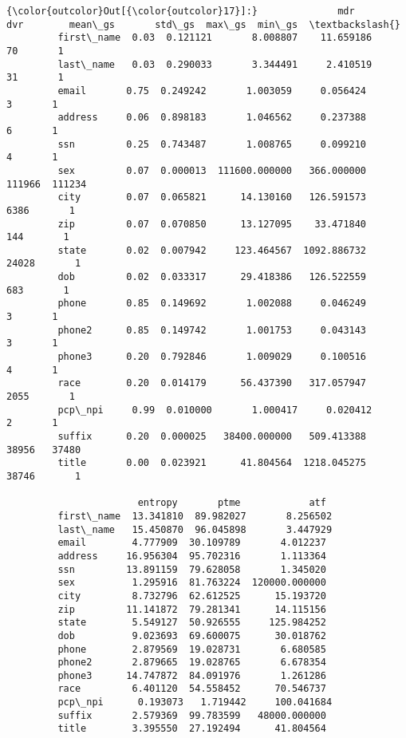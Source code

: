 \documentclass[11pt]{article}
\begin{document}
\begin{Verbatim}[commandchars=\\\{\}]
{\color{outcolor}Out[{\color{outcolor}17}]:}              mdr       dvr        mean\_gs       std\_gs  max\_gs  min\_gs  \textbackslash{}
         first\_name  0.03  0.121121       8.008807    11.659186      70       1   
         last\_name   0.03  0.290033       3.344491     2.410519      31       1   
         email       0.75  0.249242       1.003059     0.056424       3       1   
         address     0.06  0.898183       1.046562     0.237388       6       1   
         ssn         0.25  0.743487       1.008765     0.099210       4       1   
         sex         0.07  0.000013  111600.000000   366.000000  111966  111234   
         city        0.07  0.065821      14.130160   126.591573    6386       1   
         zip         0.07  0.070850      13.127095    33.471840     144       1   
         state       0.02  0.007942     123.464567  1092.886732   24028       1   
         dob         0.02  0.033317      29.418386   126.522559     683       1   
         phone       0.85  0.149692       1.002088     0.046249       3       1   
         phone2      0.85  0.149742       1.001753     0.043143       3       1   
         phone3      0.20  0.792846       1.009029     0.100516       4       1   
         race        0.20  0.014179      56.437390   317.057947    2055       1   
         pcp\_npi     0.99  0.010000       1.000417     0.020412       2       1   
         suffix      0.20  0.000025   38400.000000   509.413388   38956   37480   
         title       0.00  0.023921      41.804564  1218.045275   38746       1   
         
                       entropy       ptme            atf  
         first\_name  13.341810  89.982027       8.256502  
         last\_name   15.450870  96.045898       3.447929  
         email        4.777909  30.109789       4.012237  
         address     16.956304  95.702316       1.113364  
         ssn         13.891159  79.628058       1.345020  
         sex          1.295916  81.763224  120000.000000  
         city         8.732796  62.612525      15.193720  
         zip         11.141872  79.281341      14.115156  
         state        5.549127  50.926555     125.984252  
         dob          9.023693  69.600075      30.018762  
         phone        2.879569  19.028731       6.680585  
         phone2       2.879665  19.028765       6.678354  
         phone3      14.747872  84.091976       1.261286  
         race         6.401120  54.558452      70.546737  
         pcp\_npi      0.193073   1.719442     100.041684  
         suffix       2.579369  99.783599   48000.000000  
         title        3.395550  27.192494      41.804564  
\end{Verbatim}
            
\end{document}

